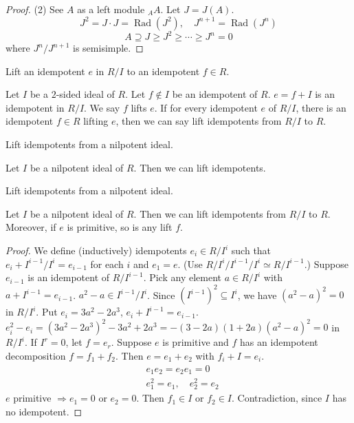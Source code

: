\documentclass[11pt, a4paper]{report}
\begin{document}
\begin{proof}
(2) See $A$ as a left module ${}_{A}A$. Let $J=J(A)$.
\[
J^{2}=J \cdot J=\operatorname{Rad}\left(J^{2}\right), \quad J^{n+1}=\operatorname{Rad}\left(J^{n}\right)
\]
\[
A \supseteq J \geq J^{2} \geq \cdots \geq J^{n}=0
\]
where $J^{n} / J^{n+1}$ is semisimple.
\end{proof}

\begin{definition}
Lift an idempotent $e$ in $R / I$ to an idempotent $f \in R$.

Let $I$ be a $2$-sided ideal of $R$. Let $f \notin I$ be an idempotent of $R$. $e=f+I$ is an idempotent in $R / I$. We say $f$ lifts $e$. If for every idempotent $e$ of $R / I$, there is an idempotent $f \in R$ lifting $e$, then we can say lift idempotents from $R / I$ to $R$.
\end{definition}

\begin{theorem}
Lift idempotents from a nilpotent ideal.

Let $I$ be a nilpotent ideal of $R$. Then we can lift idempotents.
\end{theorem}

\begin{theorem}
Lift idempotents from a nilpotent ideal.

Let $I$ be a nilpotent ideal of $R$. Then we can lift idempotents from $R / I$ to $R$. Moreover, if $e$ is primitive, so is any lift $f$.
\end{theorem}
\begin{proof}
We define (inductively) idempotents $e_i \in R/I^i$ such that
$e_{i} + I^{i-1}/I^{i} = e_{i-1}$ for each $i$ and $e_{1} = e$.
(Use $R/I^{i} / I^{i-1}/I^{i} \simeq R/I^{i-1}$.)
Suppose $e_{i-1}$ is an idempotent of $R/I^{i-1}$.
Pick any element $a \in R/I^{i}$ with $a + I^{i-1} = e_{i-1}$.
$a^{2} - a \in I^{i-1}/I^{i}$. Since $(I^{i-1})^{2} \subseteq I^{i}$, we have
$\left(a^{2} - a\right)^{2} = 0$ in $R/I^{i}$.
Put $e_{i} = 3a^{2} - 2a^{3}$, $e_{i} + I^{i-1} = e_{i-1}$.
$e_i^{2} - e_i = \left(3a^{2} - 2a^{3}\right)^{2} - 3a^{2} + 2a^{3} = -(3-2a)(1+2a)\left(a^{2}-a\right)^{2} = 0$ in $R/I^{i}$.
If $I^{r} = 0$, let $f = e_r$.
Suppose $e$ is primitive and $f$ has an idempotent decomposition $f = f_{1} + f_{2}$.
Then $e = e_{1} + e_{2}$ with $f_{i} + I = e_{i}$.
\[
\begin{aligned}
& e_{1} e_{2} = e_{2} e_{1} = 0 \\
& e_{1}^{2} = e_{1}, \quad e_{2}^{2} = e_{2}
\end{aligned}
\]
$e$ primitive $\Rightarrow e_{1} = 0$ or $e_{2} = 0$.
Then $f_{1} \in I$ or $f_{2} \in I$. Contradiction, since $I$ has no idempotent.
\end{proof}
\end{document}
